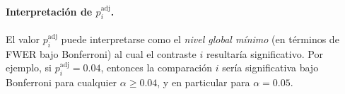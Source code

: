 \paragraph{Interpretaci\'on de $p_i^{\mathrm{adj}}$.}
El valor $p_i^{\mathrm{adj}}$ puede interpretarse como el \emph{nivel global m\'inimo} (en t\'erminos de FWER bajo Bonferroni) al cual el contraste $i$ resultar\'ia significativo. Por ejemplo, si $p_i^{\mathrm{adj}}=0.04$, entonces la comparaci\'on $i$ ser\'ia significativa bajo Bonferroni para cualquier $\alpha\ge 0.04$, y en particular para $\alpha=0.05$.
